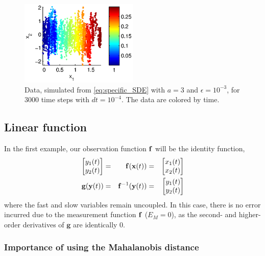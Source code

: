 \begin{figure}[t]
\centering
\includegraphics[width=0.5\textwidth]{data_init}
%
\caption[Linear multiscale data]{Data, simulated from \eqref{eq:specific_SDE} with $a=3$ and $\epsilon = 10^{-3}$, for $3000$ time steps with $dt = 10^{-4}$. The data are colored by time.}
\label{fig:initial_data}
\end{figure}

\subsection{Linear function} \label{subsec:linear_example}

In the first example, our observation function $\mathbf{f}$ will be the identity function,
%
\begin{equation} \label{eq:linear_transform}
\begin{aligned}
\begin{bmatrix}
y_1(t) \\ y_2(t)
\end{bmatrix} &=&
\mathbf{f}(\mathbf{x}(t)) &=&
\begin{bmatrix} x_1(t) \\ x_2(t) \end{bmatrix} \\
\mathbf{g}(\mathbf{y}(t)) &=& \mathbf{f}^{-1} (\mathbf{y}(t)) &=& \begin{bmatrix} y_1(t) \\ y_2(t) \end{bmatrix}
\end{aligned}
\end{equation}
%
where the fast and slow variables remain uncoupled.
%
In this case, there is no error incurred due to the measurement function $\mathbf{f}$ ($E_M = 0$), as the second- and higher-order derivatives of $\mathbf{g}$ are identically 0.

\subsubsection{Importance of using the Mahalanobis distance}

